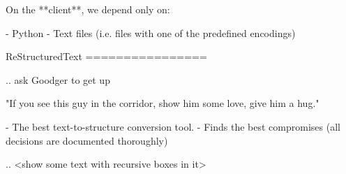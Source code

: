 On the **client**, we depend only on:

- Python
- Text files (i.e. files with one of the predefined encodings)



ReStructuredText
================

.. ask Goodger to get up

   "If you see this guy in the corridor, show him some love, give him a hug."

- The best text-to-structure conversion tool.
- Finds the best compromises (all decisions are documented thoroughly)


.. <show some text with recursive boxes in it> 

